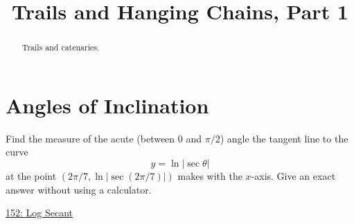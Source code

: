 \documentclass{ximera}
\title{Trails and Hanging Chains, Part 1}
\begin{document}
\begin{abstract}
Trails and catenaries.
\end{abstract}
\maketitle


\section{Angles of Inclination}

\begin{question}  \label{QPdiftgerdf}
Find the measure of the acute (between $0$ and $\pi/2$) angle the tangent line to the curve
\[
     y = \ln | \sec \theta|
\]
at the point $(2\pi/7, \ln |\sec (2\pi/7)|)$ makes with the $x$-axis. Give an exact answer without using a calculator.



\begin{onlineOnly}
    \begin{center}
\end{center}
\end{onlineOnly}

\href{https://www.desmos.com/calculator/yyyj3pjmk2}{152: Log Secant}
\end{question}
\end{document}

